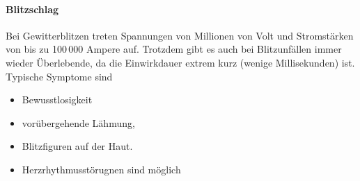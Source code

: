 \paragraph{Blitzschlag} Bei Gewitterblitzen treten
Spannungen von Millionen von Volt und Stromstärken von bis
zu 100\,000 Ampere auf. Trotzdem gibt es auch bei Blitzunfällen immer wieder Überlebende, da die Einwirkdauer extrem kurz (wenige Millisekunden) ist. Typische Symptome sind
\begin{itemize}
	\item Bewusstlosigkeit
	\item vorübergehende Lähmung,
	\item Blitzfiguren auf der Haut.
	\item Herzrhythmusstörugnen sind möglich
\end{itemize}


